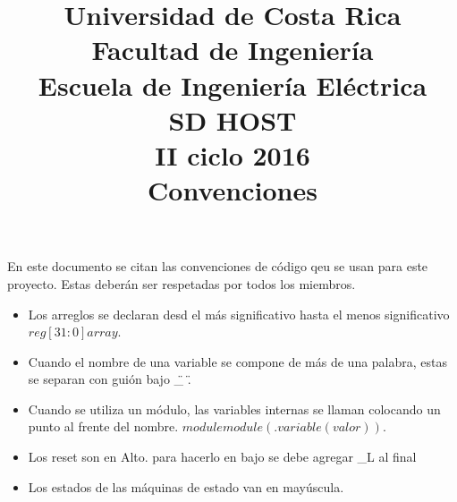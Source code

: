 

\title{Universidad de Costa Rica\\{\small Facultad de Ingeniería\\Escuela de Ingeniería
    Eléctrica\\SD HOST\\II ciclo 2016\\\vspace*{0.55in} Convenciones}}





En este documento se citan las convenciones de código qeu se usan para este proyecto. Estas deberán
ser respetadas por todos los miembros. 

\begin{itemize}
\item Los arreglos se declaran desd el más significativo hasta el menos significativo $reg [31:0] array$.
\item Cuando el nombre de una variable se compone de más de una palabra, estas se separan con guión
  bajo \"\_ \".
\item Cuando se utiliza un módulo, las variables internas se llaman colocando un punto al frente del
  nombre. $module module(.variable(valor))$. 
\item Los reset son en Alto. para hacerlo en bajo se debe agregar \_L al final
\item Los estados de las máquinas de estado van en mayúscula.
\end{itemize}
\newpage


\grid

